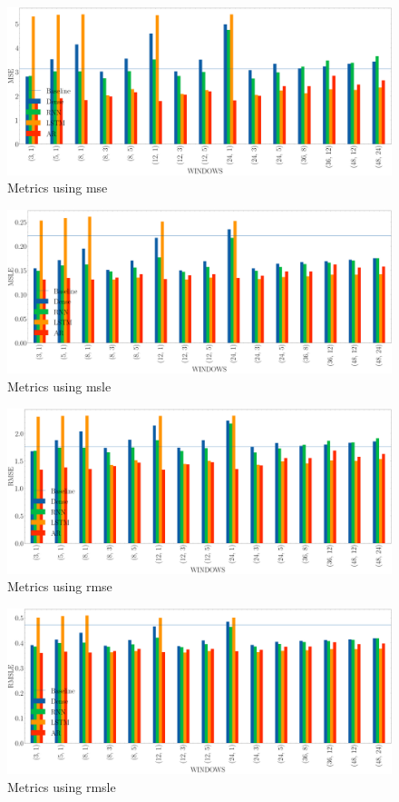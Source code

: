 \begin{figure}[H]
    \centering
    \includegraphics[width=15cm]{images/solution/metrics/MSE.png}
    \caption{Metrics using \acrshort{mse}}
\end{figure}

\begin{figure}[H]
    \centering
    \includegraphics[width=15cm]{images/solution/metrics/MSLE.png}
    \caption{Metrics using \acrshort{msle}}
\end{figure}

\begin{figure}[H]
    \centering
    \includegraphics[width=15cm]{images/solution/metrics/RMSE.png}
    \caption{Metrics using \acrshort{rmse}}
\end{figure}

\begin{figure}[H]
    \centering
     \includegraphics[width=15cm]{images/solution/metrics/RMSLE.png}
    \caption{Metrics using \acrshort{rmsle}}
\end{figure}